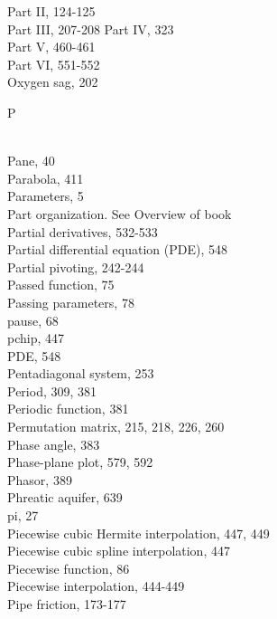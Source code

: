 \documentclass[../main.tex]{subfiles}
\begin{document}
\begin{multicols}{3}
    \hspace*{3mm}Part II, 124-125\\
    \hspace*{3mm}Part III, 207-208
    \hspace*{3mm}Part IV, 323\\
    \hspace*{3mm}Part V, 460-461\\
    \hspace*{3mm}Part VI, 551-552\\
    Oxygen sag, 202\vspace*{2mm}\\
    \begin{huge} P \end{huge}\\
    Pane, 40\\
    Parabola, 411\\
    Parameters, 5\\
    Part organization. See Overview of book\\
    Partial derivatives, 532-533\\
    Partial differential equation (PDE), 548\\
    Partial pivoting, 242-244\\
    Passed function, 75\\
    Passing parameters, 78\\
    pause, 68\\
    pchip, 447\\
    PDE, 548\\
    Pentadiagonal system, 253\\
    Period, 309, 381\\
    Periodic function, 381\\
    Permutation matrix, 215, 218, 226, 260\\
    Phase angle, 383\\
    Phase-plane plot, 579, 592\\
    Phasor, 389\\
    Phreatic aquifer, 639\\
    pi, 27\\
    Piecewise cubic Hermite interpolation, 447, 449\\
    Piecewise cubic spline interpolation, 447\\
    Piecewise function, 86\\
    Piecewise interpolation, 444-449\\
    Pipe friction, 173-177\\

\end{multicols}
\end{document}

